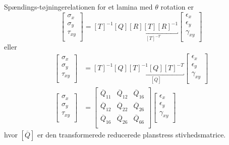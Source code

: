 Spændings-tøjningerelationen for et lamina med $\theta$ rotation er
\begin{equation*}
  \begin{bmatrix}
    \sigma_x\\
  \sigma_y\\
  \tau_{xy}\\
\end{bmatrix} = \left[ T \right]^{-1} \left[ Q \right] \underbracket{\left[ R \right]\left[ T \right]\left[ R \right]^{-1}}_{\left[ T \right]^{-T}} \begin{bmatrix}
  \epsilon_x\\
\epsilon_y\\
\gamma_{xy}\\
\end{bmatrix}
\end{equation*}
eller
\begin{align*}
  \begin{bmatrix}
    \sigma_x\\
  \sigma_y\\
  \tau_{xy}\\
  \end{bmatrix} &= \left[ T \right]^{-1} \left[ Q \right] \underbracket{\left[ T \right]^{-1} \left[ Q \right]\left[ T \right]^{-T}}_{\left[ \overline{Q} \right]} \begin{bmatrix}
  \epsilon_x\\
\epsilon_y\\
\gamma_{xy}\\
\end{bmatrix} \\
\begin{bmatrix}
  \sigma_x\\
\sigma_y\\
\tau_{xy}\\
\end{bmatrix} &= \begin{bmatrix}
  \overline{Q}_{11} & \overline{Q}_{12} & \overline{Q}_{16}\\
\overline{Q}_{12} & \overline{Q}_{22} & \overline{Q}_{26}\\
\overline{Q}_{16} & \overline{Q}_{26} & \overline{Q}_{66}\\
\end{bmatrix} \begin{bmatrix}
  \epsilon_x\\
\epsilon_y\\
\gamma_{xy}\\
\end{bmatrix}
\end{align*}
hvor $[\overline{Q}]$ er den transformerede reducerede planstress stivhedsmatrice.

